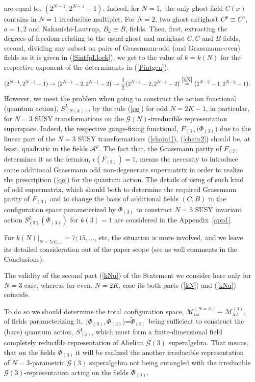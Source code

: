 \documentclass[10pt]{article}
\begin{document}
are equal to, $(2^{N-1}, 2^{N-1}-1) $.  Indeed, for $N=1,$ the only ghost field $C(x)$ contains in $N=1$ irreducible multiplet. For $N=2$, two ghost-antighost $C^p\equiv C^a$, $a=1,2$  and Nakanishi-Lautrup, $B_2\equiv B$, fields. Then, first, extracting the   degrees of freedom relating to the  usual ghost and antighost $C, \overline{C}$ and $B$ fields, second,  dividing any subset on pairs  of Grassmann-odd (and Grassmann-even) fields as it is given  in (\ref{SintfpLlock}), we get to the  value of $k=k(N)$ for the respective exponent of the determinants in (\ref{Pintgen}):
 \begin{equation}\label{kNp}
   (2^{N-1}, 2^{N-1}-1)  \to  \big(2^{N-1}-2, 2^{N-1}-2\big) \to  \frac{1}{2}\big(2^{N-1}-2, 2^{N-1}-2\big) \stackrel{\ref{kN}}{=} \big(2^{N-2}-1, 2^{N-2}-1\big).
 \end{equation}
 However, we meet the problem when going to construct the action functional (quantum action),  $S^L_{(N(k))}$, by the rule   (\ref{qe}) for odd $N=2K-1$, in particular, for $N=3$ SUSY transformations on the $\mathcal{G}(N)$-irreducible representation superspace.
Indeed, the  respective gauge-fixing  functional,  $F_{(3)}\big(\Phi_{(3)}\big)$  due to the linear part of the $N=3$ SUSY transformations (\ref{chain1}), (\ref{chain2})  should be, at least, quadratic in the  fields $\mathcal{A}^\mu$. The fact that, the Grassmann parity of $F_{(3)}$ determines it as the fermion, $\epsilon(F_{(3)})=1$, means  the necessity to introduce some additional Grassmann odd non-degenerate supermatrix  in order to realize the prescription (\ref{qe}) for the quantum action.
The details of  using of such kind of odd supermatrix, which should both to determine the required  Grassmann parity of $F_{(3)}$ and to change the basis of additional fields $(C,B)$ in the configuration space parameterized by $\Phi_{(3)}$ to construct $N=3$ SUSY invariant action  $S^L_{(3)}(\Phi_{(3)})$ for $k(3)=1$ are considered in the Appendix~\ref{app1}.

For $k(N)\big|_{N=5;6,...}=7;15,\ldots $, etc, the situation is more involved,
and we leave its detailed consideration out of the paper scope (see as well comments in the Conclusions).

The validity of the second part (\ref{kNu}) of the Statement we consider here only for $N=3$  case, whereas for even,  $N=2K$,  case its both parts (\ref{kN}) and (\ref{kNu}) coincide.

To do so we should  determine the total configuration space, $\mathcal{M}^{(N=3)}_{tot}\equiv \mathcal{M}^{(3)}_{tot}$, of fields parameterizing it, $\big(\Phi_{(3)}, \overline{\Phi}_{(3)}\big)$=$\widetilde{\Phi}_{(3)} $ being sufficient to construct the (bare) quantum action, ${S}^L_{(3)}$, which must form a finite-dimensional field completely reducible representation of Abelian $\mathcal{G}(3)$ superalgebra. That means, that on the fields $\overline{\Phi}_{(3)}$ it will be realized the another irreducible representation  of $N=3$-parametric $\mathcal{G}(3)$ superalgebra not being entangled with the irreducible  $\mathcal{G}(3)$-representation acting on the fields $\Phi_{(3)}$.
\end{document}
